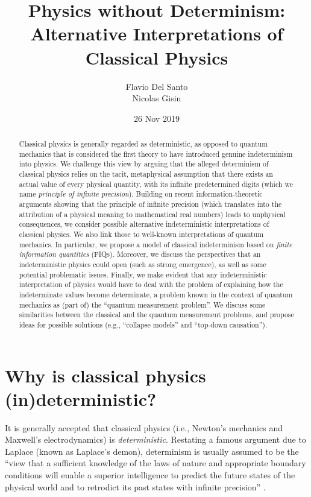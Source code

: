\documentclass[12pt]{article}
\begin{document}
\title{Physics without Determinism: Alternative Interpretations of Classical Physics}
\author{Flavio Del Santo \\ Nicolas Gisin}


\date{26 Nov 2019}

\maketitle

\begin{abstract}
Classical physics is generally regarded as deterministic, as opposed to quantum mechanics that is considered the first theory to have introduced genuine indeterminism into physics. We challenge this view by arguing that the alleged determinism of classical physics relies on the tacit, metaphysical assumption that there exists an actual value of every physical quantity, with its infinite predetermined digits (which we name \emph{principle of infinite precision}). Building on recent information-theoretic arguments showing that the principle of infinite precision (which translates into the attribution of a physical meaning to mathematical real numbers) leads to unphysical consequences, we consider possible alternative indeterministic interpretations of classical physics. We also link those to well-known interpretations of quantum mechanics. In particular, we propose a model of classical indeterminism based on \emph{finite information quantities} (FIQs). Moreover, we discuss the perspectives that an indeterministic physics could open (such as strong emergence), as well as some potential problematic issues. Finally, we make evident that any indeterministic interpretation of physics would have to deal with the problem of explaining how the indeterminate values become determinate, a problem known in the context of quantum mechanics as (part of) the ``quantum measurement problem''. We discuss some similarities between the classical and the quantum measurement problems, and propose ideas for possible solutions (e.g., ``collapse models'' and ``top-down causation'').


\end{abstract}

\section{Why is classical physics (in)deterministic?}
It is generally accepted that classical physics (i.e., Newton's mechanics and Maxwell's electrodynamics) is \emph{deterministic}. Restating a famous argument due to Laplace (known as Laplace's demon), determinism is usually assumed to be the ``view that a sufficient knowledge of the laws of nature and appropriate boundary conditions will enable a superior intelligence to predict the future states of the physical world and to retrodict its past states with infinite precision'' \cite{determinism}.
\end{document}
